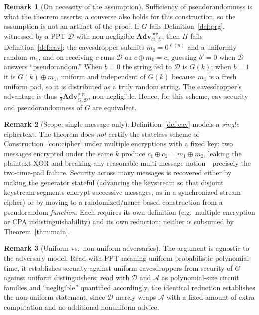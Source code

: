 \documentclass[11pt]{article}
\theoremstyle{plain}
\theoremstyle{definition}
\newtheorem{remark}{Remark}
\newcommand{\secp}{n}                       %
\newcommand{\adv}{\mathcal{A}}
\newcommand{\dist}{\mathcal{D}}
\newcommand{\PPT}{\mathrm{PPT}}
\newcommand{\Adv}{\mathbf{Adv}}
\newcommand{\eav}{\mathrm{eav}}
\newcommand{\prg}{\mathrm{prg}}
\newcommand{\Pron}{\Pi}
\begin{document}
\begin{remark}[On necessity of the assumption]
Sufficiency of pseudorandomness is what the theorem asserts; a converse also
holds for this construction, so the assumption is not an artifact of the proof.
If $G$ fails Definition~\ref{def:prg}, witnessed by a $\PPT$ $\dist$ with
non-negligible $\Adv^{\prg}_{G,\dist}$, then $\Pron$ fails
Definition~\ref{def:eav}: the eavesdropper submits $m_0 = 0^{\ell(\secp)}$ and a
uniformly random $m_1$, and on receiving $c$ runs $\dist$ on $c \oplus m_0 = c$,
guessing $b'=0$ when $\dist$ answers ``pseudorandom.'' When $b=0$ the string fed
to $\dist$ is $G(k)$; when $b=1$ it is $G(k)\oplus m_1$, uniform and independent
of $G(k)$ because $m_1$ is a fresh uniform pad, so it is distributed as a truly
random string. The eavesdropper's advantage is thus $\tfrac12\Adv^{\prg}_{G,\dist}$,
non-negligible. Hence, for this scheme, $\eav$-security and pseudorandomness of
$G$ are equivalent.
\end{remark}

\begin{remark}[Scope: single message only]
Definition~\ref{def:eav} models a \emph{single} ciphertext. The theorem does
\emph{not} certify the stateless scheme of Construction~\ref{con:cipher} under
multiple encryptions with a fixed key: two messages encrypted under the same
$k$ produce $c_1 \oplus c_2 = m_1 \oplus m_2$, leaking the plaintext XOR and
breaking any reasonable multi-message notion---precisely the two-time-pad
failure. Security across many messages is recovered either by making the
generator stateful (advancing the keystream so that disjoint keystream segments
encrypt successive messages, as in a synchronized stream cipher) or by moving to
a randomized/nonce-based construction from a pseudorandom \emph{function}. Each
requires its own definition (e.g.\ multiple-encryption or CPA indistinguishability)
and its own reduction; neither is subsumed by Theorem~\ref{thm:main}.
\end{remark}

\begin{remark}[Uniform vs.\ non-uniform adversaries]
The argument is agnostic to the adversary model. Read with $\PPT$ meaning
uniform probabilistic polynomial time, it establishes security against uniform
eavesdroppers from security of $G$ against uniform distinguishers; read with
$\dist$ and $\adv$ as polynomial-size circuit families and ``negligible'' quantified
accordingly, the identical reduction establishes the non-uniform statement, since
$\dist$ merely wraps $\adv$ with a fixed amount of extra computation and no
additional nonuniform advice.
\end{remark}
\end{document}
